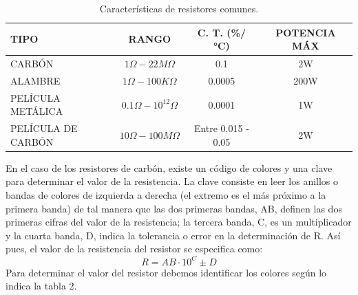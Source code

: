 \documentclass[12pt, a4paper]{article}
\begin{document}
\begin{table}[H]
    \centering
    \small
    \caption{Características de resistores comunes.}
    \begin{tabular}{|l|c|c|c|}
        \hline
        \textbf{TIPO} & \textbf{RANGO} & \textbf{C. T. (\%/°C)} & \textbf{POTENCIA MÁX} \\
        \hline
        CARBÓN & $1\Omega - 22M\Omega$ & 0.1 & 2W \\
        \hline
        ALAMBRE & $1\Omega - 100K\Omega$ & 0.0005 & 200W \\
        \hline
        PELÍCULA METÁLICA & $0.1\Omega - 10^{12}\Omega$ & 0.0001 & 1W \\
        \hline
        PELÍCULA DE CARBÓN & $10\Omega - 100M\Omega$ & Entre 0.015 - 0.05 & 2W \\
        \hline
    \end{tabular}
\end{table}

En el caso de los resistores de carbón, existe un código de colores y una clave para determinar el valor de la resistencia. 
La clave consiste en leer los anillos o bandas de colores de izquierda a derecha (el extremo es el más próximo a la primera banda) 
de tal manera que las dos primeras bandas, AB, definen las dos primeras cifras del valor de la resistencia; la tercera banda, 
C, es un multiplicador y la cuarta banda, D, indica la tolerancia o error en la determinación de R. Así pues, el valor de la 
resistencia del resistor se especifica como:
\[ R = AB \cdot 10^C \pm D \]
Para determinar el valor del resistor debemos identificar los colores según lo indica la tabla 2.
\end{document}
